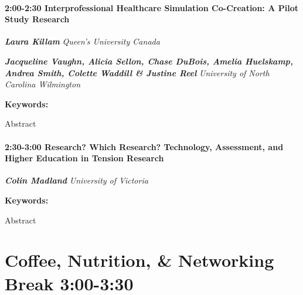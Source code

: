 \documentclass[
]{book}
\begin{document}
\begin{session}
\hypertarget{interprofessional-healthcare-simulation-co-creation-a-pilot-study-research}{%
\paragraph*{\texorpdfstring{2:00-2:30 \textbar{}
\textbf{Interprofessional Healthcare Simulation Co-Creation: A Pilot
Study} \textbar{}
Research}{2:00-2:30 \textbar{} Interprofessional Healthcare Simulation Co-Creation: A Pilot Study \textbar{} Research}}\label{interprofessional-healthcare-simulation-co-creation-a-pilot-study-research}}

\textbf{\emph{Laura Killam}} \textbar{} \emph{Queen's University Canada}

\textbf{\emph{Jacqueline Vaughn, Alicia Sellon, Chase DuBois, Amelia
Huelskamp, Andrea Smith, Colette Waddill \& Justine Reel}} \textbar{}
\emph{University of North Carolina Wilmington}

\textbf{Keywords:}

Abstract
\end{session}

\begin{session}
\hypertarget{research-which-research-technology-assessment-and-higher-education-in-tension-research}{%
\paragraph*{\texorpdfstring{2:30-3:00 \textbar{} \textbf{Research? Which
Research? Technology, Assessment, and Higher Education in Tension}
\textbar{}
Research}{2:30-3:00 \textbar{} Research? Which Research? Technology, Assessment, and Higher Education in Tension \textbar{} Research}}\label{research-which-research-technology-assessment-and-higher-education-in-tension-research}}

\textbf{\emph{Colin Madland}} \textbar{} \emph{University of Victoria}

\textbf{Keywords:}

Abstract
\end{session}

\hypertarget{coffee-nutrition-networking-break-300-330-4}{%
\section*{Coffee, Nutrition, \& Networking Break \textbar{} 3:00-3:30}\label{coffee-nutrition-networking-break-300-330-4}}
\end{document}
